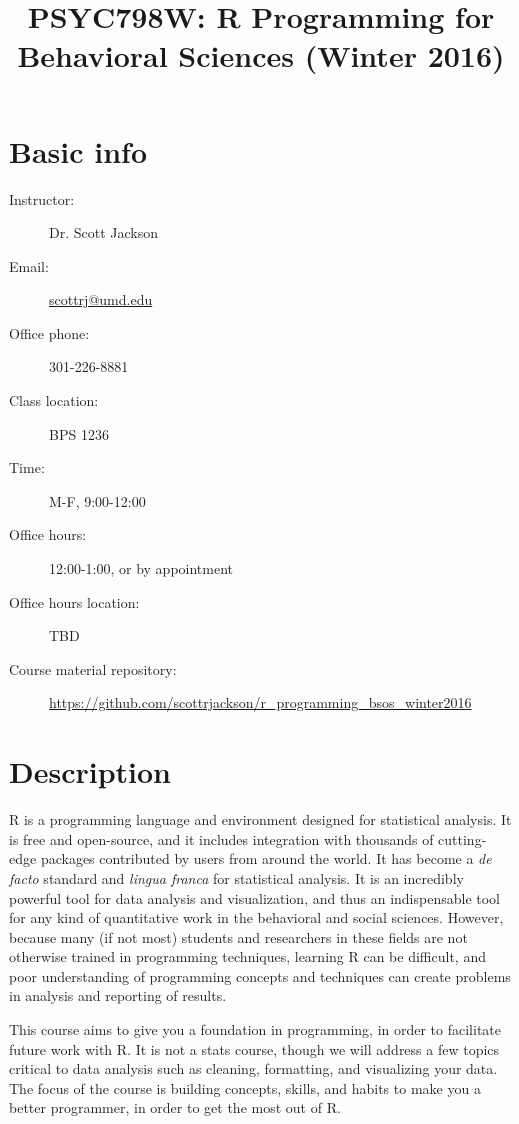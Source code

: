 \documentclass{tufte-handout}
\title{PSYC798W: R Programming for Behavioral Sciences (Winter 2016)}
\author{}
\date{}
\begin{document}
\maketitle


\section*{Basic info}
\label{sec-1}

\begin{description}
\item[Instructor:] Dr. Scott Jackson
\item[Email:] \href{mailto:scottrj@umd.edu}{scottrj@umd.edu}
\item[Office phone:] 301-226-8881
\item[Class location:] BPS 1236
\item[Time:] M-F, 9:00-12:00
\item[Office hours:] 12:00-1:00, or by appointment
\item[Office hours location:] TBD
\item[Course material repository:] \href{https://github.com/scottrjackson/r_programming_bsos_winter2016}{https://github.com/scottrjackson/r\_programming\_bsos\_winter2016}
\end{description}
\section*{Description}
\label{sec-2}

R is a programming language and environment designed for statistical analysis. It is free and open-source, and it includes integration with thousands of cutting-edge packages contributed by users from around the world. It has become a \emph{de facto} standard and \emph{lingua franca} for statistical analysis.  It is an incredibly powerful tool for data analysis and visualization, and thus an indispensable tool for any kind of quantitative work in the behavioral and social sciences. However, because many (if not most) students and researchers in these fields are not otherwise trained in programming techniques, learning R can be difficult, and poor understanding of programming concepts and techniques can create problems in analysis and reporting of results. 

This course aims to give you a foundation in programming, in order to facilitate future work with R.  It is not a stats course, though we will address a few topics critical to data analysis such as cleaning, formatting, and visualizing your data.  The focus of the course is building concepts, skills, and habits to make you a better programmer, in order to get the most out of R.
\end{document}
